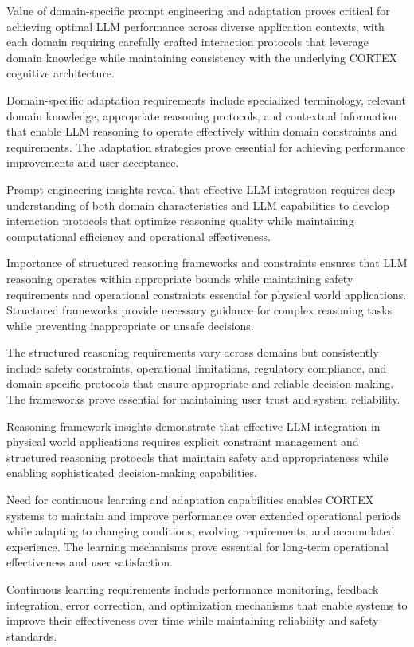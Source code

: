 Value of domain-specific prompt engineering and adaptation proves critical for achieving optimal LLM performance across diverse application contexts, with each domain requiring carefully crafted interaction protocols that leverage domain knowledge while maintaining consistency with the underlying CORTEX cognitive architecture.

Domain-specific adaptation requirements include specialized terminology, relevant domain knowledge, appropriate reasoning protocols, and contextual information that enable LLM reasoning to operate effectively within domain constraints and requirements. The adaptation strategies prove essential for achieving performance improvements and user acceptance.

Prompt engineering insights reveal that effective LLM integration requires deep understanding of both domain characteristics and LLM capabilities to develop interaction protocols that optimize reasoning quality while maintaining computational efficiency and operational effectiveness.

Importance of structured reasoning frameworks and constraints ensures that LLM reasoning operates within appropriate bounds while maintaining safety requirements and operational constraints essential for physical world applications. Structured frameworks provide necessary guidance for complex reasoning tasks while preventing inappropriate or unsafe decisions.

The structured reasoning requirements vary across domains but consistently include safety constraints, operational limitations, regulatory compliance, and domain-specific protocols that ensure appropriate and reliable decision-making. The frameworks prove essential for maintaining user trust and system reliability.

Reasoning framework insights demonstrate that effective LLM integration in physical world applications requires explicit constraint management and structured reasoning protocols that maintain safety and appropriateness while enabling sophisticated decision-making capabilities.

Need for continuous learning and adaptation capabilities enables CORTEX systems to maintain and improve performance over extended operational periods while adapting to changing conditions, evolving requirements, and accumulated experience. The learning mechanisms prove essential for long-term operational effectiveness and user satisfaction.

Continuous learning requirements include performance monitoring, feedback integration, error correction, and optimization mechanisms that enable systems to improve their effectiveness over time while maintaining reliability and safety standards.

